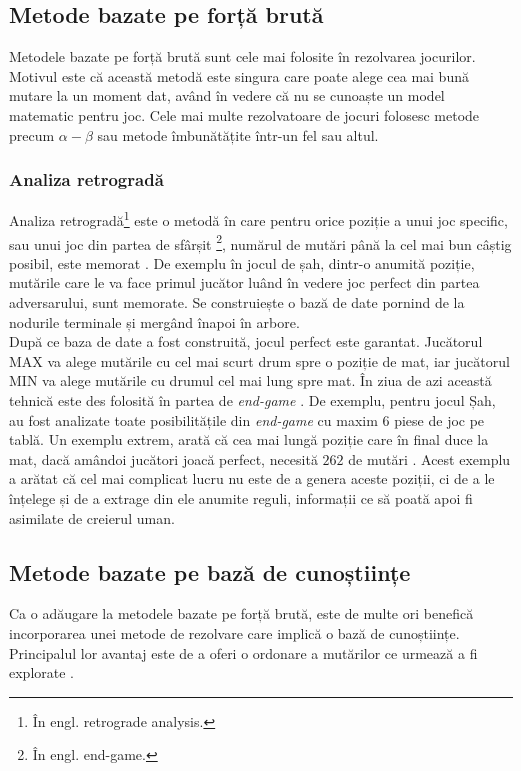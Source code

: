 \documentclass[12pt,twoside,a4paper,fleqn]{book}
\theoremstyle{definition}
\begin{document}
\subsection{Metode bazate pe forță brută}
Metodele bazate pe forță brută sunt cele mai folosite în rezolvarea jocurilor. Motivul este că această metodă este singura care poate alege cea mai bună mutare la un moment dat, având în vedere că nu se cunoaște un model matematic pentru joc. Cele mai multe rezolvatoare de jocuri folosesc metode precum $\alpha-\beta$ sau metode îmbunătățite într-un fel sau altul.

\subsubsection{Analiza retrogradă}
Analiza retrogradă\footnote{În engl. retrograde analysis.} este o metodă în care pentru orice poziție a unui joc specific, sau unui joc din partea de sfârșit \footnote{În engl. end-game.}, numărul de mutări până la cel mai bun câștig posibil, este memorat \cite{herik}. De exemplu în jocul de șah, dintr-o anumită poziție, mutările care le va face primul jucător luând în vedere joc perfect din partea adversarului, sunt memorate. Se construiește o bază de date pornind de la nodurile terminale și mergând înapoi în arbore.\\
După ce baza de date a fost construită, jocul perfect este garantat. Jucătorul MAX va alege mutările cu cel mai scurt drum spre o poziție de mat, iar jucătorul MIN va alege mutările cu drumul cel mai lung spre mat. În ziua de azi această tehnică este des folosită în partea de \emph{end-game} \cite{herik}. De exemplu, pentru jocul Șah, au fost analizate toate posibilitățile din \emph{end-game} cu maxim $6$ piese de joc pe tablă. Un exemplu extrem, arată că cea mai lungă poziție care în final duce la mat, dacă amândoi jucători joacă perfect, necesită $262$ de mutări \cite{herik}. Acest exemplu a arătat că cel mai complicat lucru nu este de a genera aceste poziții, ci de a le înțelege și de a extrage din ele anumite reguli, informații ce să poată apoi fi asimilate de creierul uman.

\subsection{Metode bazate pe bază de cunoștiințe}
Ca o adăugare la metodele bazate pe forță brută, este de multe ori benefică incorporarea unei metode de rezolvare care implică o bază de cunoștiințe. Principalul lor avantaj este de a oferi o ordonare a mutărilor ce urmează a fi explorate \cite{herik}.
\end{document}
